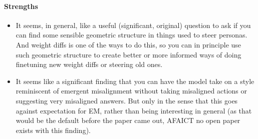 \paragraph{Strengths}
\begin{itemize}
  \item It seems, in general, like a useful (significant, original) question to
  ask if you can find some sensible geometric structure in things used to steer
  personas. And weight diffs is one of the ways to do this, so you can in
  principle use such geometric structure to create better or more informed ways
  of doing finetuning new weight diffs or steering old ones.
  \item It seems like a significant finding that you can have the model take on
  a style reminiscent of emergent misalignment without taking misaligned
  actions or suggesting very misaligned answers. But only in the sense that
  this goes against expectation for EM, rather than being interesting in
  general (as that would be the default before the paper came out, AFAICT no
  open paper exists with this finding).
\end{itemize}

